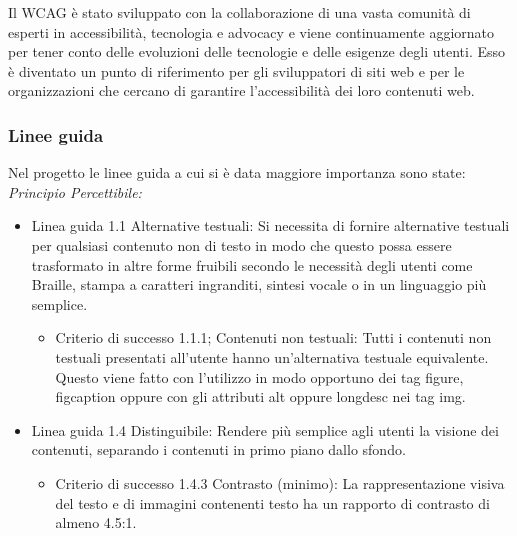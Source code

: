 \documentclass[a4paper,final,12pt]{report}
\begin{document}
Il WCAG è stato sviluppato con la collaborazione di una vasta comunità di esperti in accessibilità, tecnologia e advocacy e viene continuamente aggiornato per tener conto delle evoluzioni delle tecnologie e delle esigenze degli utenti. Esso è diventato un punto di riferimento per gli sviluppatori di siti web e per le organizzazioni che cercano di garantire l'accessibilità dei loro contenuti web.

\subsubsection{Linee guida}
Nel progetto le linee guida a cui si è data maggiore importanza sono state:\\
\emph{Principio Percettibile:}
\begin{itemize}
\item Linea guida 1.1 Alternative testuali: Si necessita di fornire alternative testuali per qualsiasi contenuto non di testo in modo che
questo possa essere trasformato in altre forme fruibili secondo le necessità degli utenti come Braille, stampa a caratteri ingranditi, sintesi vocale o in un linguaggio più semplice.
\begin{itemize}
\item Criterio di successo 1.1.1; Contenuti non testuali: Tutti i contenuti non testuali presentati all'utente hanno un'alternativa testuale equivalente. Questo viene fatto con l'utilizzo in modo opportuno dei tag figure, figcaption oppure con gli attributi alt oppure longdesc nei tag img.
\end{itemize}
\item Linea guida 1.4 Distinguibile: Rendere più semplice agli utenti la visione dei contenuti, separando i contenuti in primo piano dallo sfondo.
\begin{itemize}
\item Criterio di successo 1.4.3 Contrasto (minimo): La rappresentazione visiva del testo e di immagini contenenti testo ha un rapporto di
contrasto di almeno 4.5:1.
\end{itemize}


\end{itemize}
\end{document}

